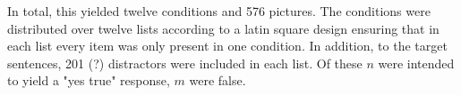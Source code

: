 \documentclass[fleqn,reqno,10pt,draft]{article}
\begin{document}
In total, this yielded twelve conditions and 576 pictures. The conditions were distributed over twelve lists according to a latin square design ensuring that in each list every item was only present in one condition. In addition, to the target sentences, 201 (?) distractors were included in each list. Of these $n$ were intended to yield a "yes true" response, $m$ were false.

\begin{figure}[t]
  \centering
 
\begin{minipage}{6cm}

   \end{minipage}
   \begin{minipage}{6cm}

   \end{minipage}
        \caption{}
\label{fig:EA}
\end{figure}
\end{document}
